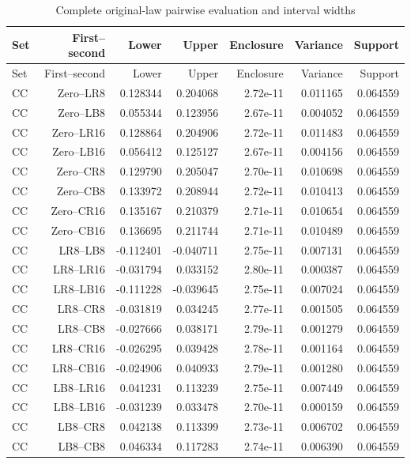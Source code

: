 {\small\setlength{\tabcolsep}{3pt}
\begin{longtable}{lrrrrrr}
\caption{Complete original-law pairwise evaluation and interval widths}\label{tab:allprospective89}\\
\hline
Set & First--second & Lower & Upper & Enclosure & Variance & Support \\
\hline
\endfirsthead
\hline
Set & First--second & Lower & Upper & Enclosure & Variance & Support \\
\hline
\endhead
CC & Zero--LR8 & 0.128344 & 0.204068 & 2.72e-11 & 0.011165 & 0.064559 \\
CC & Zero--LB8 & 0.055344 & 0.123956 & 2.67e-11 & 0.004052 & 0.064559 \\
CC & Zero--LR16 & 0.128864 & 0.204906 & 2.72e-11 & 0.011483 & 0.064559 \\
CC & Zero--LB16 & 0.056412 & 0.125127 & 2.67e-11 & 0.004156 & 0.064559 \\
CC & Zero--CR8 & 0.129790 & 0.205047 & 2.70e-11 & 0.010698 & 0.064559 \\
CC & Zero--CB8 & 0.133972 & 0.208944 & 2.72e-11 & 0.010413 & 0.064559 \\
CC & Zero--CR16 & 0.135167 & 0.210379 & 2.71e-11 & 0.010654 & 0.064559 \\
CC & Zero--CB16 & 0.136695 & 0.211744 & 2.71e-11 & 0.010489 & 0.064559 \\
CC & LR8--LB8 & -0.112401 & -0.040711 & 2.75e-11 & 0.007131 & 0.064559 \\
CC & LR8--LR16 & -0.031794 & 0.033152 & 2.80e-11 & 0.000387 & 0.064559 \\
CC & LR8--LB16 & -0.111228 & -0.039645 & 2.75e-11 & 0.007024 & 0.064559 \\
CC & LR8--CR8 & -0.031819 & 0.034245 & 2.77e-11 & 0.001505 & 0.064559 \\
CC & LR8--CB8 & -0.027666 & 0.038171 & 2.79e-11 & 0.001279 & 0.064559 \\
CC & LR8--CR16 & -0.026295 & 0.039428 & 2.78e-11 & 0.001164 & 0.064559 \\
CC & LR8--CB16 & -0.024906 & 0.040933 & 2.79e-11 & 0.001280 & 0.064559 \\
CC & LB8--LR16 & 0.041231 & 0.113239 & 2.75e-11 & 0.007449 & 0.064559 \\
CC & LB8--LB16 & -0.031239 & 0.033478 & 2.70e-11 & 0.000159 & 0.064559 \\
CC & LB8--CR8 & 0.042138 & 0.113399 & 2.73e-11 & 0.006702 & 0.064559 \\
CC & LB8--CB8 & 0.046334 & 0.117283 & 2.74e-11 & 0.006390 & 0.064559 \\

\end{longtable}}
